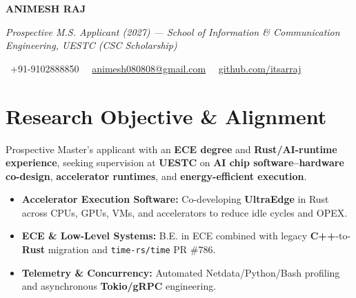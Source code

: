 \documentclass[a4paper,11pt]{article}
\newcommand{\socialicon}[1]{\raisebox{-0.05em}{\resizebox{!}{1em}{#1}}}
\newcommand{\headerfontiii}{\fontfamily{ppl}\selectfont} %
\begin{document}
\headerfontiii

\begin{center}
    {\Huge\textbf{ANIMESH RAJ}}
\end{center}
\vspace{-6mm}

\begin{center}
    {\small\textit{Prospective M.S. Applicant (2027) --- School of Information \& Communication Engineering, UESTC (CSC Scholarship)}}
\end{center}
\vspace{-6mm}

\begin{center}
    {\small
    \socialicon{\faPhone}\ +91-9102888850 \textbar\ 
    \socialicon{\faEnvelope}\ \href{mailto:animesh080808@gmail.com}{animesh080808@gmail.com} \textbar\ 
    \socialicon{\faGithub}\ \href{https://github.com/itsarraj}{github.com/itsarraj}
    }
\end{center}
\vspace{-4mm}

\section{\textbf{Research Objective \& Alignment}}
\vspace{1mm}
{\small
Prospective Master's applicant with an \textbf{ECE degree} and \textbf{Rust/AI-runtime experience}, seeking supervision at \textbf{UESTC} on \textbf{AI chip software–hardware co-design}, \textbf{accelerator runtimes}, and \textbf{energy-efficient execution}.
\begin{itemize}[leftmargin=3ex, itemsep=0.4mm, topsep=1mm]
    \item \textbf{Accelerator Execution Software:} Co-developing \textbf{UltraEdge} in Rust across CPUs, GPUs, VMs, and accelerators to reduce idle cycles and OPEX.
    \item \textbf{ECE \& Low-Level Systems:} B.E. in ECE combined with legacy \textbf{C++}-to-\textbf{Rust} migration and \texttt{time-rs/time} PR \#786.
    \item \textbf{Telemetry \& Concurrency:} Automated Netdata/Python/Bash profiling and asynchronous \textbf{Tokio/gRPC} engineering.
\end{itemize}
}
\vspace{-3mm}
\end{document}
